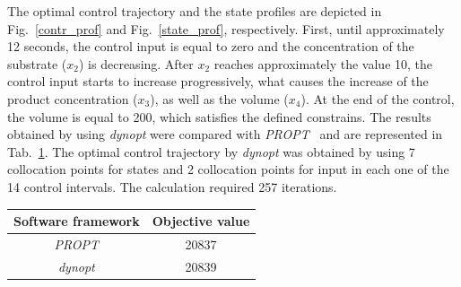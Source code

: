 The optimal control trajectory and the state profiles are depicted in
Fig.~\ref{contr_prof} and Fig.~\ref{state_prof}, respectively. First,
until approximately 12 seconds, the control input is equal to zero and
the concentration of the substrate ($x_2$) is decreasing. After $x_2$ reaches approximately the value 10, the control input starts
to increase progressively, what causes the increase of the product
concentration ($x_3$), as well as the volume ($x_4$). At the end of the control, the
volume is equal to 200, which satisfies the defined constrains. The
results obtained by using \textit{dynopt} were compared with
\textit{PROPT}~\cite{rut10} and are represented in
Tab.~\ref{tab:compar}. The optimal control trajectory by \textit{dynopt} was obtained by using 7 collocation points for states and 2 collocation points for input in each one of the 14 control intervals. The calculation required 257 iterations.

\begin{table}[t]
	\centering
	\begin{tabular}{c|c}
		Software framework & Objective value \\ \hline
		\textit{PROPT} & 20837 \\
		\textit{dynopt} & 20839		
	\end{tabular}
	\label{tab:compar}
\end{table}

